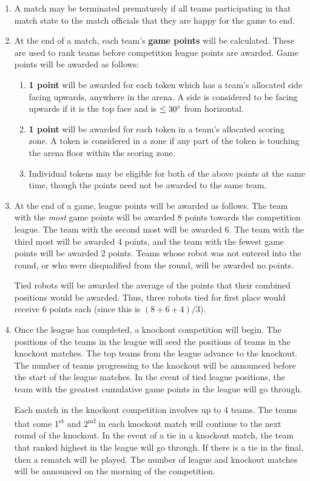 \begin{enumerate}
\item A match may be terminated prematurely if all teams participating in that match state to the match officials that they are happy for the game to end.

\item At the end of a match, each team's \textbf{game points} will be calculated.
      These are used to rank teams before competition league points are awarded.
      Game points will be awarded as follows:
      \begin {enumerate}
      \item \textbf{1 point} will be awarded for each token which has a team's allocated side facing upwards, anywhere in the arena.
            A side is considered to be facing upwards if it is the top face and is $\leq 30\degree$ from horizontal.
      \item \textbf{1 point} will be awarded for each token in a team's allocated scoring zone.
            A token is considered in a zone if any part of the token is touching the arena floor within the scoring zone.
      \item Individual tokens may be eligible for both of the above points at the same time, though the points need not be awarded to the same team.
      \end{enumerate}

\item At the end of a game, league points will be awarded as follows.
      The team with the \emph{most} game points will be awarded 8 points towards the competition league.
      The team with the second most will be awarded 6.
      The team with the third most will be awarded 4 points, and the team with the fewest game points will be awarded 2 points.
      Teams whose robot was not entered into the round, or who were disqualified from the round, will be awarded no points.

      Tied robots will be awarded the average of the points that their combined positions would be awarded.
      Thus, three robots tied for first place would receive 6 points each (since this is $(8+6+4)/3$).

\item Once the league has completed, a knockout competition will begin.
      The positions of the teams in the league will seed the positions of teams in the knockout matches.
      The top teams from the league advance to the knockout.
      The number of teams progressing to the knockout will be announced before the start of the league matches.
      In the event of tied league positions, the team with the greatest cumulative game points in the league will go through.

      Each match in the knockout competition involves up to 4 teams.
      The teams that come 1\textsuperscript{st} and 2\textsuperscript{nd} in each knockout match will continue to the next round of the knockout.
      In the event of a tie in a knockout match, the team that ranked highest in the league will go through.
      If there is a tie in the final, then a rematch will be played.
      The number of league and knockout matches will be announced on the morning of the competition.

\end{enumerate}
